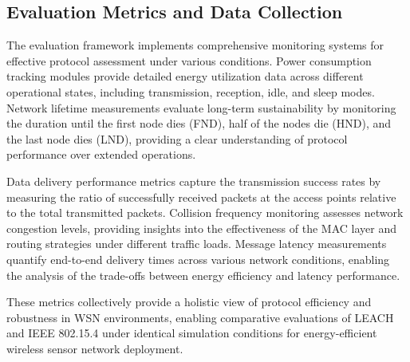 \documentclass[conference]{IEEEtran}
\begin{document}
\subsection{Evaluation Metrics and Data Collection}

The evaluation framework implements comprehensive monitoring systems for effective protocol assessment under various conditions. Power consumption tracking modules provide detailed energy utilization data across different operational states, including transmission, reception, idle, and sleep modes. Network lifetime measurements evaluate long-term sustainability by monitoring the duration until the first node dies (FND), half of the nodes die (HND), and the last node dies (LND), providing a clear understanding of protocol performance over extended operations.

Data delivery performance metrics capture the transmission success rates by measuring the ratio of successfully received packets at the access points relative to the total transmitted packets. Collision frequency monitoring assesses network congestion levels, providing insights into the effectiveness of the MAC layer and routing strategies under different traffic loads. Message latency measurements quantify end-to-end delivery times across various network conditions, enabling the analysis of the trade-offs between energy efficiency and latency performance.

These metrics collectively provide a holistic view of protocol efficiency and robustness in WSN environments, enabling comparative evaluations of LEACH and IEEE 802.15.4 under identical simulation conditions for energy-efficient wireless sensor network deployment.
\end{document}
